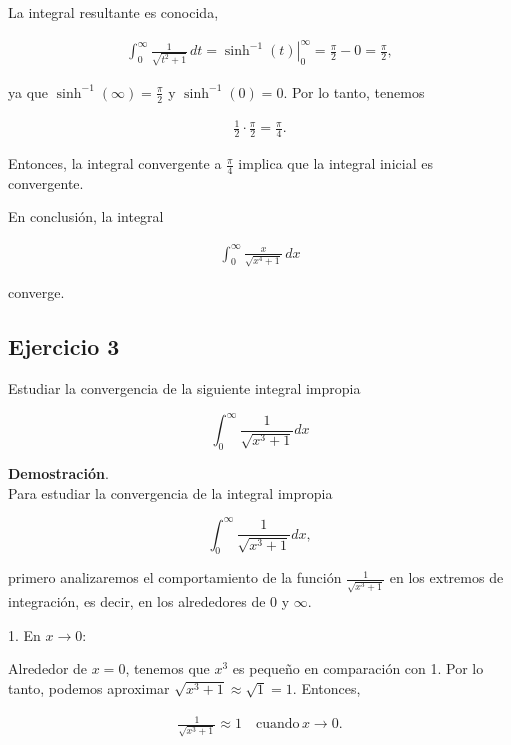 \documentclass{article}
\begin{document}
    La integral resultante es conocida,

    \begin{align*}
    \int_{0}^{\infty} \frac{1}{\sqrt{t^2 + 1}} \, dt = \left. \sinh^{-1}(t) \right|_{0}^{\infty} = \frac{\pi}{2} - 0 = \frac{\pi}{2},
    \end{align*}

    ya que $\sinh^{-1}(\infty) = \frac{\pi}{2}$ y $\sinh^{-1}(0) = 0$. Por lo tanto, tenemos

    \begin{align*}
    \frac{1}{2} \cdot \frac{\pi}{2} = \frac{\pi}{4}.
    \end{align*}

    Entonces, la integral convergente a $\frac{\pi}{4}$ implica que la integral inicial es convergente.

    En conclusión, la integral

    \begin{align*}
    \int_{0}^{\infty} \frac{x}{\sqrt{x^{4}+1}} \, dx
    \end{align*}

    converge.



    \subsection*{Ejercicio 3}

    Estudiar la convergencia de la siguiente integral impropia

    $$
    \int_{0}^{\infty} \frac{1}{\sqrt{x^{3}+1}} d x
    $$

    \textbf{Demostración}.\\

    Para estudiar la convergencia de la integral impropia

    $$
    \int_{0}^{\infty} \frac{1}{\sqrt{x^{3}+1}} d x,
    $$

    primero analizaremos el comportamiento de la función \( \frac{1}{\sqrt{x^3 + 1}} \) en los extremos de integración, es decir, en los alrededores de 0 y \(\infty\).

    1. En \( x \to 0 \):

    Alrededor de \( x = 0 \), tenemos que \( x^3 \) es pequeño en comparación con 1. Por lo tanto, podemos aproximar \( \sqrt{x^3 + 1} \approx \sqrt{1} = 1 \). Entonces,

    \begin{align*}
    \frac{1}{\sqrt{x^3 + 1}} \approx 1 \quad \text{cuando} \, x \to 0.
    \end{align*}
\end{document}
